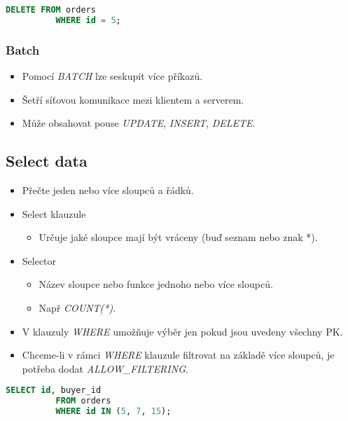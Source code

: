 \documentclass{article}
\begin{document}
        \begin{lstlisting}[language=sql]
          DELETE FROM orders
          WHERE id = 5;
        \end{lstlisting}

      \subsubsection{Batch}
        \begin{itemize}
          \item Pomocí \emph{BATCH} lze seskupit více příkazů.
          \item Šetří síťovou komunikace mezi klientem a serverem.
          \item Může obsahovat pouse \emph{UPDATE}, \emph{INSERT}, \emph{DELETE}.
        \end{itemize}

      \subsection{Select data}
        \begin{itemize}
          \item Přečte jeden nebo více sloupců a řádků.
          \item Select klauzule
            \begin{itemize}
              \item Určuje jaké sloupce mají být vráceny (buď seznam nebo znak *).
            \end{itemize}
          \item Selector
            \begin{itemize}
              \item Název sloupce nebo funkce jednoho nebo více sloupců.
              \item Např \emph{COUNT(*)}.
            \end{itemize}
          \item V klauzuly \emph{WHERE} umožňuje výběr jen pokud jsou uvedeny všechny PK.
          \item Chceme-li v rámci \emph{WHERE} klauzule filtrovat na základě více sloupců, je potřeba dodat \emph{ALLOW\_FILTERING}.
        \end{itemize}

        \begin{lstlisting}[language=sql]
          SELECT id, buyer_id
          FROM orders
          WHERE id IN (5, 7, 15);
        \end{lstlisting}
\end{document}
